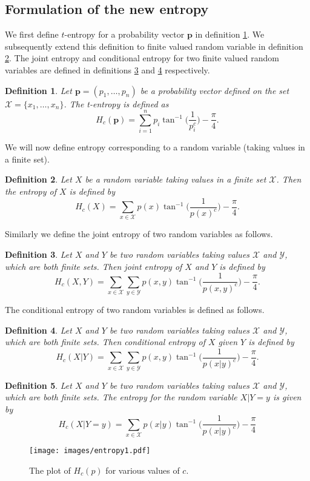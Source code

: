 \documentclass{article}
\newcommand{\bp}{\boldsymbol{p}}
\newtheorem{defn}{Definition}
\begin{document}
\subsection{Formulation of the new entropy}\label{formulation}
We first define $t$-entropy for a probability vector $\bp$ in definition \ref{d:1}. We subsequently extend this definition to finite valued random variable in definition \ref{d:2}. The joint entropy and conditional entropy for two finite valued random variables are defined in definitions \ref{d:3} and \ref{d:4} respectively.  
\begin{defn}
\label{d:1}
Let $\bp=(p_1,\dots,p_n)$ be a probability vector defined on the set $\mathcal{X}=\{x_1,\dots,x_n\}$. The t-entropy is defined as 
$$H_c(\bp)=\sum_{i=1}^n p_i \tan^{-1}\bigg(\frac{1}{p_i^c}\bigg) - \frac{\pi}{4}.$$
\end{defn}

We will now define entropy corresponding to a random variable (taking values in a finite set).
\begin{defn}
\label{d:2}
Let $X$ be a random variable taking values in a finite set $\mathcal{X}$. Then the entropy of $X$ is defined by
$$H_c(X)=\sum_{x \in \mathcal{X}} p(x) \tan^{-1}\bigg(\frac{1}{p(x)^c}\bigg) - \frac{\pi}{4}.$$
\end{defn}
Similarly we define the joint entropy of two random variables as follows.
\begin{defn}
\label{d:3}
Let $X$ and $Y$ be two random variables taking values $\mathcal{X}$ and $\mathcal{Y}$, which are both finite sets. Then joint entropy of $X$ and $Y$ is defined by
$$H_c(X,Y)=\sum_{x \in \mathcal{X}}\sum_{y \in \mathcal{Y}} p(x,y) \tan^{-1}\bigg(\frac{1}{p(x,y)^c}\bigg) - \frac{\pi}{4}.$$
\end{defn}

The conditional entropy of two random variables is defined as follows.
\begin{defn}
\label{d:4}
Let $X$ and $Y$ be two random variables taking values $\mathcal{X}$ and $\mathcal{Y}$, which are both finite sets. Then conditional entropy of $X$ given $Y$ is defined by
$$H_c(X|Y)=\sum_{x \in \mathcal{X}}\sum_{y \in \mathcal{Y}} p(x,y) \tan^{-1}\bigg(\frac{1}{p(x|y)^c}\bigg) - \frac{\pi}{4}.$$
\end{defn}

\begin{defn}
\label{cor1}
Let $X$ and $Y$ be two random variables taking values $\mathcal{X}$ and $\mathcal{Y}$, which are both finite sets. The entropy for the random variable $X|Y=y$ is given by 
$$H_c(X|Y=y)=\sum_{x \in \mathcal{X}}p(x|y) \tan^{-1}\bigg(\frac{1}{p(x|y)^c}\bigg) - \frac{\pi}{4}$$
\end{defn}
\begin{figure}
    \centering
    \texttt{[image: images/entropy1.pdf]}
    \caption{The plot of $H_c(p)$ for various values of $c$.}
    \label{fig:e_plot}
\end{figure}
\end{document}
